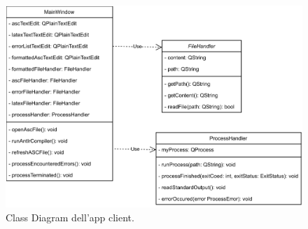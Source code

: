 \begin{figure}[h!]
	\centering
	\includegraphics[width=\textwidth]{./ImageFiles/client app diagram}
	\caption{Class Diagram dell'app client.}
	\label{fig:class_diagram_client}
\end{figure}

\clearpage

